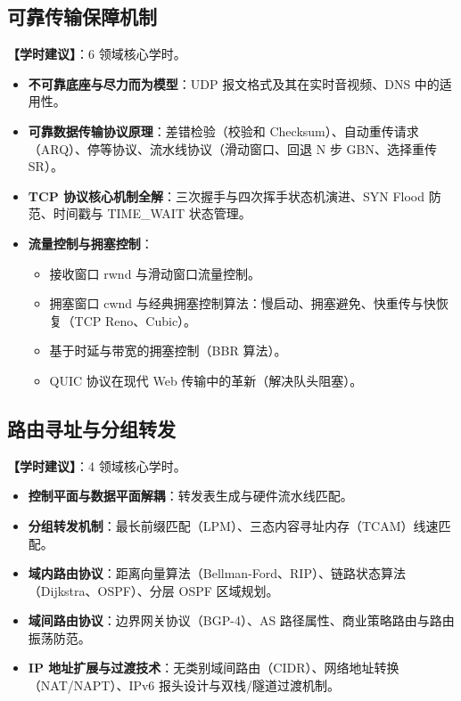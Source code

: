 \subsection{可靠传输保障机制}
\textbf{【学时建议】}：6 领域核心学时。

\begin{itemize}
    \item \textbf{不可靠底座与尽力而为模型}：UDP 报文格式及其在实时音视频、DNS 中的适用性。
    \item \textbf{可靠数据传输协议原理}：差错检验（校验和 Checksum）、自动重传请求（ARQ）、停等协议、流水线协议（滑动窗口、回退 N 步 GBN、选择重传 SR）。
    \item \textbf{TCP 协议核心机制全解}：三次握手与四次挥手状态机演进、SYN Flood 防范、时间戳与 TIME\_WAIT 状态管理。
    \item \textbf{流量控制与拥塞控制}：
    \begin{itemize}
        \item 接收窗口 rwnd 与滑动窗口流量控制。
        \item 拥塞窗口 cwnd 与经典拥塞控制算法：慢启动、拥塞避免、快重传与快恢复（TCP Reno、Cubic）。
        \item 基于时延与带宽的拥塞控制（BBR 算法）。
        \item QUIC 协议在现代 Web 传输中的革新（解决队头阻塞）。
    \end{itemize}
\end{itemize}

\subsection{路由寻址与分组转发}
\textbf{【学时建议】}：4 领域核心学时。

\begin{itemize}
    \item \textbf{控制平面与数据平面解耦}：转发表生成与硬件流水线匹配。
    \item \textbf{分组转发机制}：最长前缀匹配（LPM）、三态内容寻址内存（TCAM）线速匹配。
    \item \textbf{域内路由协议}：距离向量算法（Bellman-Ford、RIP）、链路状态算法（Dijkstra、OSPF）、分层 OSPF 区域规划。
    \item \textbf{域间路由协议}：边界网关协议（BGP-4）、AS 路径属性、商业策略路由与路由振荡防范。
    \item \textbf{IP 地址扩展与过渡技术}：无类别域间路由（CIDR）、网络地址转换（NAT/NAPT）、IPv6 报头设计与双栈/隧道过渡机制。
\end{itemize}

